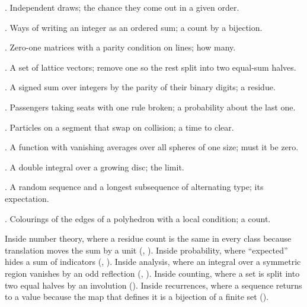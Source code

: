 \begin{ladder}
\item {}. Independent draws; the chance they come out in a given order.
\item {}. Ways of writing an integer as an ordered sum; a count by a bijection.
\item {}. Zero-one matrices with a parity condition on lines; how many.
\item {}. A set of lattice vectors; remove one so the rest split into two equal-sum halves.
\item {}. A signed sum over integers by the parity of their binary digits; a residue.
\item {}. Passengers taking seats with one rule broken; a probability about the last one.
\item {}. Particles on a segment that swap on collision; a time to clear.
\item {}. A function with vanishing averages over all spheres of one size; must it be zero.
\item {}. A double integral over a growing disc; the limit.
\item {}. A random sequence and a longest subsequence of alternating type; its expectation.
\item {}. Colourings of the edges of a polyhedron with a local condition; a count.
\end{ladder}

\begin{hides}
Inside number theory, where a residue count is the same in every class because translation moves the sum by a unit (, ). Inside probability, where ``expected'' hides a sum of indicators (, ). Inside analysis, where an integral over a symmetric region vanishes by an odd reflection (, ). Inside counting, where a set is split into two equal halves by an involution (). Inside recurrences, where a sequence returns to a value because the map that defines it is a bijection of a finite set ().
\end{hides}

